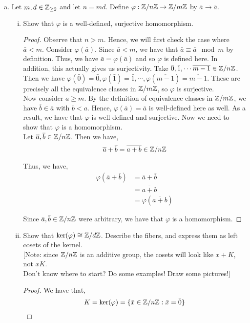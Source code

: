 \documentclass[11pt, reqno]{amsart}
\theoremstyle{plain}
\theoremstyle{definition}
\theoremstyle{example}
\newenvironment{ans}{\color{black}\medskip \paragraph*{\emph{Answer}.}}{\hfill \break  $~\!\!$ \dotfill \medskip }
\def\f{\varphi}
\begin{document}
\begin{enumerate}[1.]
\begin{enumerate}[(a)]
\begin{enumerate}[(i)]
\begin{ans}
So for any $c \in \CC$, we have that $cK$ maps every element of $K$ into an element in the pre-image of $\varphi(c)$
\end{ans}
\end{enumerate} 

\item Let $m, d \in \mathbb{Z}_{\ge 2}$ and let $n = md$. Define $\f: \ZZ/n\ZZ \to \ZZ/m\ZZ$ by $\bar{a} \to \bar{a}$. 
\begin{enumerate}[(i)]
\item Show that $\f$ is a well-defined, surjective homomorphism. 
\begin{proof}
Observe that $n > m$. Hence, we will first check the case where $\bar{a} < m$. Consider $\varphi(\bar{a})$. Since $\bar{a} < m$, we have that $\bar{a} \equiv \bar{a} \mod m$ by definition. Thus, we have $\bar{a} = \varphi(\bar{a})$ and so $\varphi$ is defined here. In addition, this actually gives us surjectivity. Take $\bar{0}, \bar{1}, \cdots \overline{m-1} \in \mathbb{Z}/n\mathbb{Z}$. Then we have $\varphi(\bar{0}) = \bar{0}, \varphi(\bar{1}) = \bar{1}, \cdots, \varphi(\overline{m-1}) = \overline{m-1}$. These are precisely all the equivalence classes in $\mathbb{Z}/m\mathbb{Z}$, so $\varphi$ is surjective.\\

Now consider $\bar{a} \geq m$. By the definition of equivalence classes in $\mathbb{Z}/m\mathbb{Z}$, we have $\overline{b} \in \overline{a}$ with $b < a$. Hence, $\varphi(\overline{a}) = \overline{a}$ is well-defined here as well. As a result, we have that $\varphi$ is well-defined and surjective. Now we need to show that $\varphi$ is a homomorphism.\\

Let $\overline{a}, \overline{b} \in \mathbb{Z}/n\mathbb{Z}$. Then we have,
\begin{align*}
\overline{a} + \overline{b} = \overline{a + b} \in \mathbb{Z}/n\mathbb{Z}
\end{align*}

Thus, we have,
\begin{align*}
\varphi(\bar{a} + \bar{b}) &= \bar{a} + \bar{b}\\
&= \overline{a + b}\\
&= \varphi(\overline{a + b})
\end{align*}

Since $\bar{a}, \bar{b} \in \mathbb{Z}/n\mathbb{Z}$ were arbitrary, we have that $\varphi$ is a homomorphism.
\end{proof}

\newpage
\item Show that $\ker(\f) \cong \ZZ/d\ZZ$. Describe the fibers, and express them as left cosets of the kernel. \\
{\small [Note: since $\mathbb{Z}/n\mathbb{Z}$ is an additive group, the cosets will look like $x + K$, not $xK$.\\
Don't know where to start? Do some examples! Draw some pictures!]}
\begin{proof}
We have that,
\begin{align*}
K = \ker(\varphi) = \{\bar{x} \in \mathbb{Z}/n\mathbb{Z}: \bar{x} = \bar{0}\}
\end{align*}


\end{proof}
\end{enumerate}
\end{enumerate}
\end{enumerate}
\end{document}
